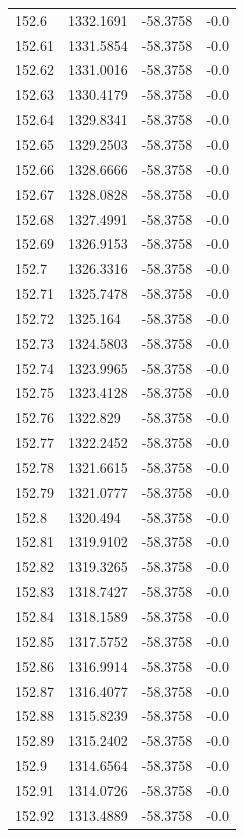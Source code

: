 \begin{table}[H]
\begin{tabular}{llll}
152.6 & 1332.1691 & -58.3758 & -0.0 \\
152.61 & 1331.5854 & -58.3758 & -0.0 \\
152.62 & 1331.0016 & -58.3758 & -0.0 \\
152.63 & 1330.4179 & -58.3758 & -0.0 \\
152.64 & 1329.8341 & -58.3758 & -0.0 \\
152.65 & 1329.2503 & -58.3758 & -0.0 \\
152.66 & 1328.6666 & -58.3758 & -0.0 \\
152.67 & 1328.0828 & -58.3758 & -0.0 \\
152.68 & 1327.4991 & -58.3758 & -0.0 \\
152.69 & 1326.9153 & -58.3758 & -0.0 \\
152.7 & 1326.3316 & -58.3758 & -0.0 \\
152.71 & 1325.7478 & -58.3758 & -0.0 \\
152.72 & 1325.164 & -58.3758 & -0.0 \\
152.73 & 1324.5803 & -58.3758 & -0.0 \\
152.74 & 1323.9965 & -58.3758 & -0.0 \\
152.75 & 1323.4128 & -58.3758 & -0.0 \\
152.76 & 1322.829 & -58.3758 & -0.0 \\
152.77 & 1322.2452 & -58.3758 & -0.0 \\
152.78 & 1321.6615 & -58.3758 & -0.0 \\
152.79 & 1321.0777 & -58.3758 & -0.0 \\
152.8 & 1320.494 & -58.3758 & -0.0 \\
152.81 & 1319.9102 & -58.3758 & -0.0 \\
152.82 & 1319.3265 & -58.3758 & -0.0 \\
152.83 & 1318.7427 & -58.3758 & -0.0 \\
152.84 & 1318.1589 & -58.3758 & -0.0 \\
152.85 & 1317.5752 & -58.3758 & -0.0 \\
152.86 & 1316.9914 & -58.3758 & -0.0 \\
152.87 & 1316.4077 & -58.3758 & -0.0 \\
152.88 & 1315.8239 & -58.3758 & -0.0 \\
152.89 & 1315.2402 & -58.3758 & -0.0 \\
152.9 & 1314.6564 & -58.3758 & -0.0 \\
152.91 & 1314.0726 & -58.3758 & -0.0 \\
152.92 & 1313.4889 & -58.3758 & -0.0 \\

\end{tabular}
\end{table}
